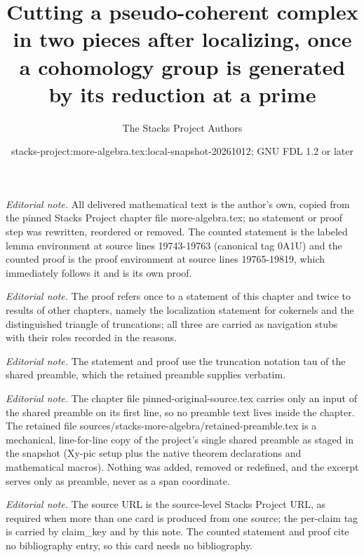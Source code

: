 \documentclass[10pt,a4paper]{amsart}
\title{Cutting a pseudo-coherent complex in two pieces after localizing, once a cohomology group is generated by its reduction at a prime}
\author{The Stacks Project Authors}
\date{stacks-project:more-algebra.tex:local-snapshot-20261012; GNU FDL 1.2 or later}
\theoremstyle{plain}
\theoremstyle{definition}
\theoremstyle{remark}
\numberwithin{equation}{subsection}
\begin{document}
\maketitle
\setcounter{subsection}{1}
\noindent\textit{Editorial note.} All delivered mathematical text is the author's own, copied from the pinned Stacks Project chapter file more-algebra.tex; no statement or proof step was rewritten, reordered or removed. The counted statement is the labeled lemma environment at source lines 19743-19763 (canonical tag 0A1U) and the counted proof is the proof environment at source lines 19765-19819, which immediately follows it and is its own proof.\par\medskip
\noindent\textit{Editorial note.} The proof refers once to a statement of this chapter and twice to results of other chapters, namely the localization statement for cokernels and the distinguished triangle of truncations; all three are carried as navigation stubs with their roles recorded in the reasons.\par\medskip
\noindent\textit{Editorial note.} The statement and proof use the truncation notation tau of the shared preamble, which the retained preamble supplies verbatim.\par\medskip
\noindent\textit{Editorial note.} The chapter file pinned-original-source.tex carries only an input of the shared preamble on its first line, so no preamble text lives inside the chapter. The retained file sources/stacks-more-algebra/retained-preamble.tex is a mechanical, line-for-line copy of the project's single shared preamble as staged in the snapshot (Xy-pic setup plus the native theorem declarations and mathematical macros). Nothing was added, removed or redefined, and the excerpt serves only as preamble, never as a span coordinate.\par\medskip
\noindent\textit{Editorial note.} The source URL is the source-level Stacks Project URL, as required when more than one card is produced from one source; the per-claim tag is carried by claim\_key and by this note. The counted statement and proof cite no bibliography entry, so this card needs no bibliography.\par\medskip
\end{document}
